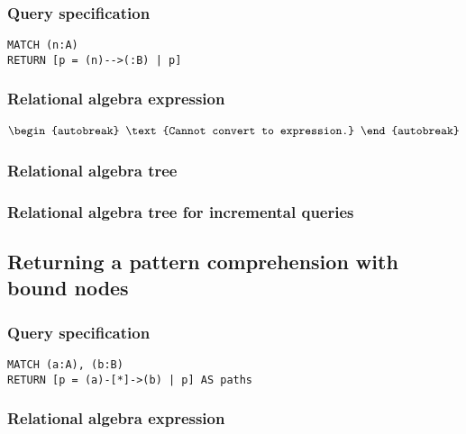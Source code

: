\subsubsection*{Query specification}

\begin{lstlisting}
MATCH (n:A)
RETURN [p = (n)-->(:B) | p]
\end{lstlisting}

\subsubsection*{Relational algebra expression}

\begin{align*}
\begin{autobreak}
\text{Cannot convert to expression.}
\end{autobreak}
\end{align*}

\subsubsection*{Relational algebra tree}


\subsubsection*{Relational algebra tree for incremental queries}


\subsection{Returning a pattern comprehension with bound nodes}

\subsubsection*{Query specification}

\begin{lstlisting}
MATCH (a:A), (b:B)
RETURN [p = (a)-[*]->(b) | p] AS paths
\end{lstlisting}

\subsubsection*{Relational algebra expression}

